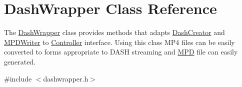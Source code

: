 \hypertarget{class_dash_wrapper}{\section{Dash\-Wrapper Class Reference}
\label{class_dash_wrapper}
}


The \hyperlink{class_dash_wrapper}{Dash\-Wrapper} class provides methods that adapts \hyperlink{class_dash_creator}{Dash\-Creator} and \hyperlink{class_m_p_d_writer}{M\-P\-D\-Writer} to \hyperlink{class_controller}{Controller} interface. Using this class M\-P4 files can be easily converted to forms appropriate to D\-A\-S\-H streaming and \hyperlink{class_m_p_d}{M\-P\-D} file can easily generated.  




{\ttfamily \#include $<$dashwrapper.\-h$>$}

